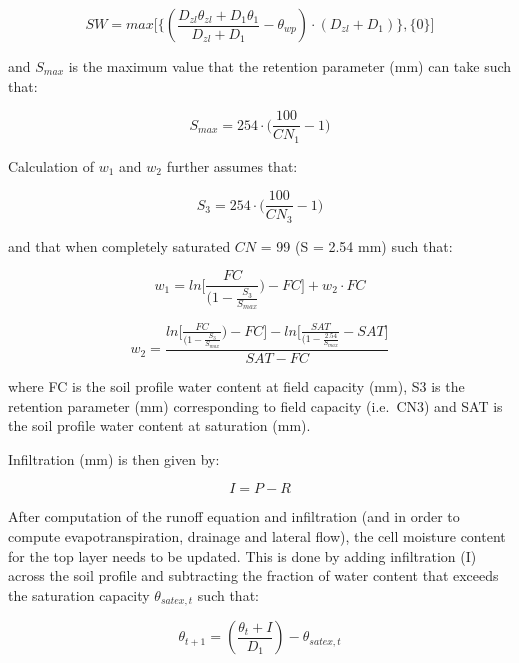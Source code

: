 \documentclass[]{article}
\begin{document}
\begin{equation}
SW = max \Big[ \Big\{(\frac{D_{zl} \theta _{zl} + D_1 \theta _1}{D_{zl}+D_1} - \theta _{wp} ) \cdot (D_{zl}+D_1) \Big\},\Big\{0 \Big\} \Big]
\label{eq:SW}
\end{equation}

and \(S_{max}\) is the maximum value that the retention parameter (mm)
can take such that:

\begin{equation}
S_{max} = 254 \cdot \big(\frac{100}{CN_1} -1 \big)
\label{eq:Smax}  
\end{equation}

Calculation of \(w_1\) and \(w_2\) further assumes that:

\begin{equation}
S_3= 254 \cdot \big(\frac{100}{CN_3}-1 \big)
\label{eq:S3}
\end{equation}

and that when completely saturated \(CN\) = 99 (S = 2.54 mm) such that:

\begin{equation}
w_1 = ln \Big[\frac{FC}{(1-\frac{S_3}{S_{max}}} )-FC \Big]+w_2 \cdot FC
\label{eq:w1}
\end{equation}

\begin{equation}
w_2 = \frac{ln \Big[\frac{FC}{(1-\frac{S_3}{S_{max}}} )-FC \Big]- ln \Big[ \frac{SAT}{(1-\frac{2.54}{S_{max}}}-SAT \Big]}{SAT-FC}
\label{eq:w2}  \end{equation}

where FC is the soil profile water content at field capacity (mm), S3 is
the retention parameter (mm) corresponding to field capacity (i.e.~CN3)
and SAT is the soil profile water content at saturation (mm).

Infiltration (mm) is then given by:

\begin{equation}
I=P-R   
\label{eq:I}  
\end{equation}

After computation of the runoff equation and infiltration (and in order
to compute evapotranspiration, drainage and lateral flow), the cell
moisture content for the top layer needs to be updated. This is done by
adding infiltration (I) across the soil profile and subtracting the
fraction of water content that exceeds the saturation capacity
\(\theta_{satex,t}\) such that:

\begin{equation}
\theta_{t+1}=(\frac{\theta_t+I}{D_1} )-\theta_{satex,t}
\label{eq:thetat1}  
\end{equation}
\end{document}
